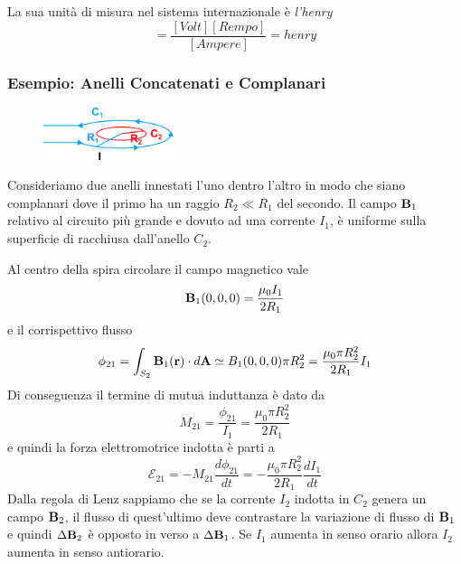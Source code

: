 La sua unit\`a di misura nel sistema internazionale \`e \textit{l'henry}
\begin{equation*}
	[M] = \frac{[Volt][Rempo]}{[Ampere]} = henry
\end{equation*}

\subsubsection{Esempio: Anelli Concatenati e Complanari}

\begin{figure} %
    \centering
    \includegraphics[width=0.34\textwidth]{images/mutual_inductance} %
\end{figure}
Consideriamo due anelli innestati l'uno dentro l'altro in modo che siano complanari dove il primo ha un raggio $R_2 \ll R_1$ del secondo. Il campo $\bold{B}_1$ relativo al circuito pi\`u grande e dovuto ad una corrente $I_1$, \`e uniforme sulla superficie di racchiusa dall'anello $C_2$.

Al centro della spira circolare il campo magnetico vale 
\begin{equation*}
	\bold{B}_1(0,0,0) = \frac{\mu_0 I_1 }{2 R_1}
\end{equation*}
e il corrispettivo flusso 
\begin{equation*}
	\phi_{21} = \int_{S_2} \bold{B}_1(\bold{r}) \cdot d\bold{A} \simeq B_{1}(0,0,0)\pi R_2^2 = \frac{\mu_0 \pi R_2^2}{2 R_1}I_1
\end{equation*}
Di conseguenza il termine di mutua induttanza \`e dato da 
\begin{equation*}
	M_{21} = \frac{\phi_{21}}{I_{1}} = \frac{\mu_0 \pi R_2^2}{2 R_1}
\end{equation*}
e quindi la forza elettromotrice indotta \`e parti a 
\begin{equation*}
	\mathcal{E}_{21} = - M_{21} \frac{d\phi_{21}}{dt} = -\frac{\mu_0 \pi R_2^2}{2R_1}\frac{dI_1}{dt}
\end{equation*}
Dalla regola di Lenz  sappiamo che se la corrente $I_2$ indotta in $C_2$ genera un campo $\bold{B}_2$, il flusso di quest'ultimo deve contrastare la variazione di flusso di $\bold{B}_1$ e quindi $\Delta \bold{B}_{2}$ \`e opposto in verso a $\Delta \bold{B}_1$. Se $I_1$ aumenta in senso orario allora $I_2$ aumenta in senso antiorario.

